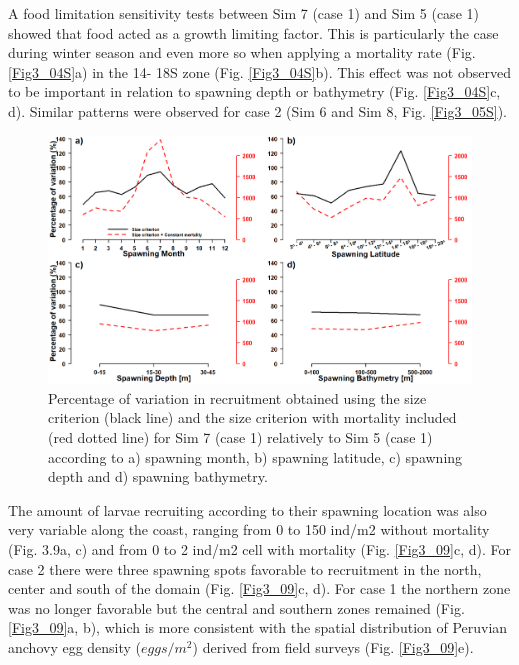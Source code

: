 A food limitation sensitivity tests between Sim 7 (case 1) and Sim 5 (case 1) showed that food acted as a growth limiting factor. This is particularly the case during winter season and even more so when applying a mortality rate (Fig. \ref{Fig3_04S}a) in the 14\textdegree - 18\textdegree S zone (Fig. \ref{Fig3_04S}b). This effect was not observed to be important in relation to spawning depth or bathymetry (Fig. \ref{Fig3_04S}c, d). Similar patterns were observed for case 2 (Sim 6 and Sim 8, Fig. \ref{Fig3_05S}).\\

\begin{figure}[ht]
	\includegraphics[width=1.0\textwidth]{figures/Fig3_08S.png}
	\centering
	\caption{Percentage of variation in recruitment obtained using the size criterion (black line) and the size criterion with mortality included (red dotted line) for Sim 7 (case 1) relatively to Sim 5 (case 1) according to a) spawning month, b) spawning latitude, c) spawning depth and d) spawning bathymetry.}
	\label{Fig3_08S}
\end{figure}

The amount of larvae recruiting according to their spawning location was also very variable along the coast, ranging from 0 to 150 ind/m2 without mortality (Fig. 3.9a, c) and from 0 to 2 ind/m2 cell with mortality (Fig. \ref{Fig3_09}c, d).  For case 2 there were three spawning spots favorable to recruitment in the north, center and south of the domain (Fig. \ref{Fig3_09}c, d). For case 1 the northern zone was no longer favorable but the central and southern zones remained (Fig. \ref{Fig3_09}a, b), which is more consistent with the spatial distribution of Peruvian anchovy egg density ($eggs/m^2$) derived from field surveys (Fig. \ref{Fig3_09}e).\\

